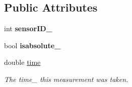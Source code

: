 \subsection*{Public Attributes}
\begin{DoxyCompactItemize}
\item 
\hypertarget{classmsf__core_1_1MSF__MeasurementBase_afad7c30029f47cea027415c04301dc48}{int {\bfseries sensor\-I\-D\-\_\-}}\label{classmsf__core_1_1MSF__MeasurementBase_afad7c30029f47cea027415c04301dc48}

\item 
\hypertarget{classmsf__core_1_1MSF__MeasurementBase_ad1ea7c4d392ecd3d894280283c04757a}{bool {\bfseries isabsolute\-\_\-}}\label{classmsf__core_1_1MSF__MeasurementBase_ad1ea7c4d392ecd3d894280283c04757a}

\item 
\hypertarget{classmsf__core_1_1MSF__MeasurementBase_a48b55b129f13afbed86db1b0543562db}{double \hyperlink{classmsf__core_1_1MSF__MeasurementBase_a48b55b129f13afbed86db1b0543562db}{time}}\label{classmsf__core_1_1MSF__MeasurementBase_a48b55b129f13afbed86db1b0543562db}

\begin{DoxyCompactList}\small\item\em The time\-\_\- this measurement was taken. \end{DoxyCompactList}\end{DoxyCompactItemize}
